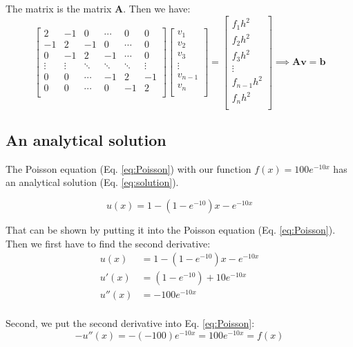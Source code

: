 The matrix is the matrix $\textbf{A}$. Then we have:
\[
    \begin{bmatrix}
    	2& -1& 0 &\cdots & 0 &0 \\
        -1 & 2 & -1 &0 &\cdots &0 \\
        0&-1 &2 & -1 & \cdots & 0 \\
        \vdots& \vdots & \ddots &\ddots &\ddots & \vdots \\
        0&0 & \cdots &-1 &2& -1 \\
        0&0 & \cdots & 0  &-1 & 2 \\
        \end{bmatrix}
\begin{bmatrix}
	v_1\\
	v_2\\
	v_3\\
	\vdots\\
	v_{n-1}\\
	v_{n}\\
\end{bmatrix}=
\begin{bmatrix}
	f_1 h^2\\
	f_2 h^2\\
	f_3 h^2\\
	\vdots\\
	f_{n-1} h^2\\
	f_{n} h^2\\
\end{bmatrix}
\implies \mathbf{A}\mathbf{v}=\mathbf{b}
\]

\subsection{An analytical solution}

The Poisson equation (Eq. \ref{eq:Poisson}) with our function $f(x) = 100e^{-10x}$ has an analytical solution (Eq. \ref{eq:solution}).

\begin{equation}\label{eq:solution}
u(x) = 1 - \left(1-e^{-10}\right)x - e^{-10x}
\end{equation}

That can be shown by putting it into the Poisson equation (Eq. \ref{eq:Poisson}). Then we first have to find the second derivative:
\begin{align*}
u(x) &= 1 - \left(1-e^{-10}\right) x - e^{-10x}\\
u'(x) &= \left(1-e^{-10}\right)+ 10 e^{-10x}\\ 
u''(x) &= -100 e^{-10x}\\
\end{align*}

Second, we put the second derivative into Eq. \ref{eq:Poisson}:
\[ -u''(x) = -(-100) e^{-10x} = 100 e^{-10x} = f(x) \]